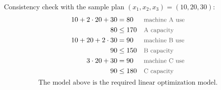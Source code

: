 \documentclass[a4paper,11pt]{article}
\newcommand{\why}[1]{\text{\small\color{black!65}#1}}
\begin{document}
Consistency check with the sample plan $(x_1,x_2,x_3)=(10,20,30)$:
\begin{align*}
10+2\cdot20+30 &= 80 && \why{machine A use}\\
80&\le170 && \why{A capacity}\\
10+20+2\cdot30 &= 90 && \why{machine B use}\\
90&\le150 && \why{B capacity}\\
3\cdot20+30 &= 90 && \why{machine C use}\\
90&\le180 && \why{C capacity}
\end{align*}
\[
\boxed{\text{The model above is the required linear optimization model.}}
\]
\end{document}
